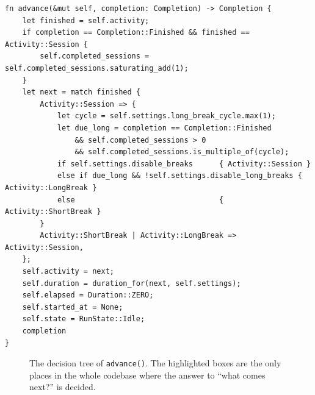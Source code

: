\begin{lstlisting}[caption={\file{timer.rs} lines 270--299. This function is the Pomodoro
specification; nothing else in the codebase contains a rule.}]
fn advance(&mut self, completion: Completion) -> Completion {
    let finished = self.activity;
    if completion == Completion::Finished && finished == Activity::Session {
        self.completed_sessions = self.completed_sessions.saturating_add(1);
    }
    let next = match finished {
        Activity::Session => {
            let cycle = self.settings.long_break_cycle.max(1);
            let due_long = completion == Completion::Finished
                && self.completed_sessions > 0
                && self.completed_sessions.is_multiple_of(cycle);
            if self.settings.disable_breaks      { Activity::Session }
            else if due_long && !self.settings.disable_long_breaks { Activity::LongBreak }
            else                                 { Activity::ShortBreak }
        }
        Activity::ShortBreak | Activity::LongBreak => Activity::Session,
    };
    self.activity = next;
    self.duration = duration_for(next, self.settings);
    self.elapsed = Duration::ZERO;
    self.started_at = None;
    self.state = RunState::Idle;
    completion
}
\end{lstlisting}

\begin{figure}[H]
\centering
{}
\caption{The decision tree of \texttt{advance()}. The highlighted boxes are the only
places in the whole codebase where the answer to ``what comes next?'' is decided.}
\label{fig:advance}
\end{figure}

